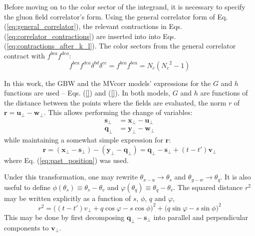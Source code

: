 Before moving on to the color sector of the integrand, it is necessary to specify the gluon field correlator's form. Using the general correlator form of Eq. (\ref{eq:general_correlator}), the relevant contractions in Eqs. (\ref{eq:correlator_contractions}) are inserted into into Eqs. (\ref{eq:contractions_after_k_l}). The color sectors from the general correlator contract with $f^{bca} f^{dea}$: %
\begin{equation}
	 f^{bca} f^{dea} \delta^{bd} \delta^{ce} = f^{bca} f^{bca} = N_c ({N_c}^2 - 1)
\end{equation}

In this work, the \gls{GBW} and the \gls{MVcorr} models' expressions for the $G$ and $h$ functions are used -- Eqs. (\ref{}) and (\ref{}). In both models, $G$ and $h$ are functions of the distance between the points where the fields are evaluated, the norm $r$ of $\mathbf{r} =  \mathbf{u}_\perp - \mathbf{w}_\perp$. This allows performing the change of variables:
\begin{subequations}
\begin{align}
	\mathbf{s}_\perp & = \mathbf{x}_\perp - \mathbf{u}_\perp \\
	\mathbf{q}_\perp & = \mathbf{y}_\perp - \mathbf{w}_\perp
\end{align}
\end{subequations}
while maintaining a somewhat simple expression for $\mathbf{r}$:
\begin{equation}
\mathbf{r} = (\mathbf{x}_\perp - \mathbf{s}_\perp) - (\mathbf{y}_\perp - \mathbf{q}_\perp) = \mathbf{q}_\perp - \mathbf{s}_\perp + (t-t')\mathbf{v}_\perp 
\end{equation}
where Eq. (\ref{eq:past_position}) was used. 

Under this transformation, one may rewrite $\theta_{x-u} \to \theta_s$ and $\theta_{y-w} \to \theta_q$. It is also useful to define $\phi(\theta_s) \equiv \theta_s - \theta_v$ and $\varphi(\theta_q) \equiv \theta_q - \theta_v$. The squared distance $r^2$ may be written explicitly as a function of $s$, $\phi$, $q$ and $\varphi$, 
\begin{equation}
	r^2 = \big((t-t')v_\perp + q \cos \varphi - s \cos \phi \big)^2 + \big(q \sin \varphi - s \sin \phi \big)^2
\end{equation}
This may be done by first decomposing $\mathbf{q}_\perp - \mathbf{s}_\perp$ into parallel and perpendicular components to $\mathbf{v}_\perp$.
	
